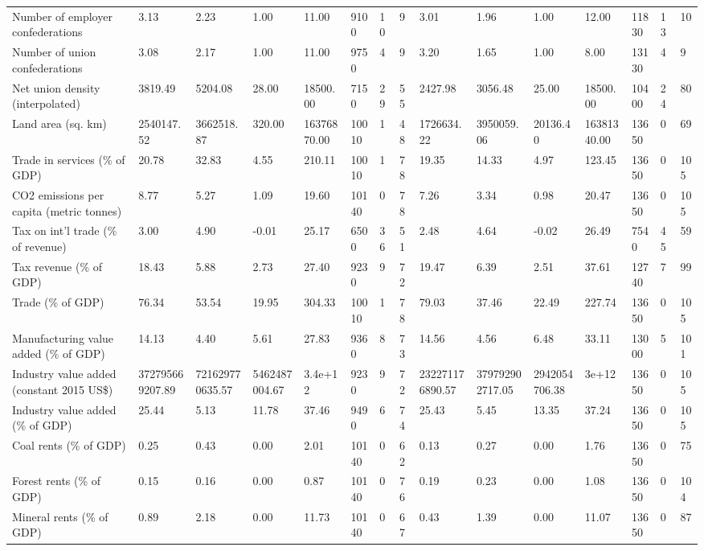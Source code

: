 \begin{longtable}{lllllllllllllll}
\addlinespace
Number of employer confederations & 3.13 & 2.23 & 1.00 & 11.00 & 9100 & 10 & 9 & 3.01 & 1.96 & 1.00 & 12.00 & 11830 & 13 & 10\\
Number of union confederations & 3.08 & 2.17 & 1.00 & 11.00 & 9750 & 4 & 9 & 3.20 & 1.65 & 1.00 & 8.00 & 13130 & 4 & 9\\
Net union density (interpolated) & 3819.49 & 5204.08 & 28.00 & 18500.00 & 7150 & 29 & 55 & 2427.98 & 3056.48 & 25.00 & 18500.00 & 10400 & 24 & 80\\
Land area (sq. km) & 2540147.52 & 3662518.87 & 320.00 & 16376870.00 & 10010 & 1 & 48 & 1726634.22 & 3950059.06 & 20136.40 & 16381340.00 & 13650 & 0 & 69\\
Trade in services (\% of GDP) & 20.78 & 32.83 & 4.55 & 210.11 & 10010 & 1 & 78 & 19.35 & 14.33 & 4.97 & 123.45 & 13650 & 0 & 105\\
\addlinespace
CO2 emissions per capita (metric tonnes) & 8.77 & 5.27 & 1.09 & 19.60 & 10140 & 0 & 78 & 7.26 & 3.34 & 0.98 & 20.47 & 13650 & 0 & 105\\
Tax on int'l trade (\% of revenue) & 3.00 & 4.90 & -0.01 & 25.17 & 6500 & 36 & 51 & 2.48 & 4.64 & -0.02 & 26.49 & 7540 & 45 & 59\\
Tax revenue (\% of GDP) & 18.43 & 5.88 & 2.73 & 27.40 & 9230 & 9 & 72 & 19.47 & 6.39 & 2.51 & 37.61 & 12740 & 7 & 99\\
Trade (\% of GDP) & 76.34 & 53.54 & 19.95 & 304.33 & 10010 & 1 & 78 & 79.03 & 37.46 & 22.49 & 227.74 & 13650 & 0 & 105\\
Manufacturing value added (\% of GDP) & 14.13 & 4.40 & 5.61 & 27.83 & 9360 & 8 & 73 & 14.56 & 4.56 & 6.48 & 33.11 & 13000 & 5 & 101\\
\addlinespace
Industry value added (constant 2015 US\$) & 372795669207.89 & 721629770635.57 & 5462487004.67 & 3.4e+12 & 9230 & 9 & 72 & 232271176890.57 & 379792902717.05 & 2942054706.38 & 3e+12 & 13650 & 0 & 105\\
Industry value added (\% of GDP) & 25.44 & 5.13 & 11.78 & 37.46 & 9490 & 6 & 74 & 25.43 & 5.45 & 13.35 & 37.24 & 13650 & 0 & 105\\
Coal rents (\% of GDP) & 0.25 & 0.43 & 0.00 & 2.01 & 10140 & 0 & 62 & 0.13 & 0.27 & 0.00 & 1.76 & 13650 & 0 & 75\\
Forest rents (\% of GDP) & 0.15 & 0.16 & 0.00 & 0.87 & 10140 & 0 & 76 & 0.19 & 0.23 & 0.00 & 1.08 & 13650 & 0 & 104\\
Mineral rents (\% of GDP) & 0.89 & 2.18 & 0.00 & 11.73 & 10140 & 0 & 67 & 0.43 & 1.39 & 0.00 & 11.07 & 13650 & 0 & 87\\

\end{longtable}
